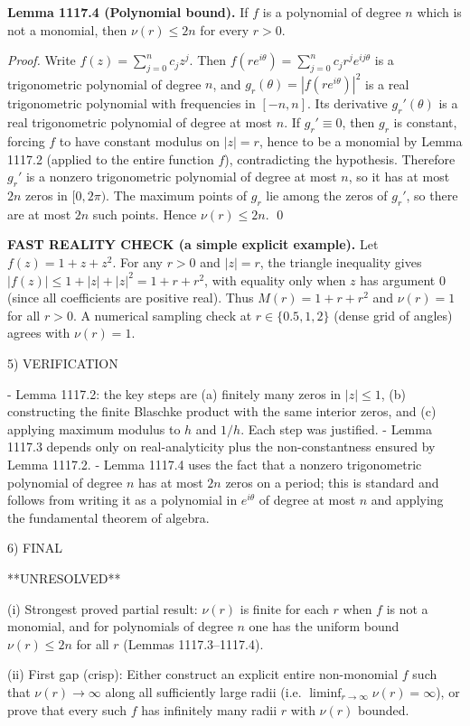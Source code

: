 \textbf{Lemma 1117.4 (Polynomial bound).}
If \(f\) is a polynomial of degree \(n\) which is not a monomial, then \(\nu(r)\le 2n\) for every \(r>0\).

\emph{Proof.}
Write \(f(z)=\sum_{j=0}^n c_j z^j\). Then
\(f(r e^{i\theta})=\sum_{j=0}^n c_j r^j e^{ij\theta}\) is a trigonometric polynomial of degree \(n\), and
\(g_r(\theta)=|f(r e^{i\theta})|^2\) is a real trigonometric polynomial with frequencies in \([-n,n]\). Its derivative \(g_r'(\theta)\) is a real trigonometric polynomial of degree at most \(n\). If \(g_r'\equiv 0\), then \(g_r\) is constant, forcing \(f\) to have constant modulus on \(|z|=r\), hence to be a monomial by Lemma 1117.2 (applied to the entire function \(f\)), contradicting the hypothesis. Therefore \(g_r'\) is a nonzero trigonometric polynomial of degree at most \(n\), so it has at most \(2n\) zeros in \([0,2\pi)\).
The maximum points of \(g_r\) lie among the zeros of \(g_r'\), so there are at most \(2n\) such points. Hence \(\nu(r)\le 2n\). \qed

\textbf{FAST REALITY CHECK (a simple explicit example).}
Let \(f(z)=1+z+z^2\). For any \(r>0\) and \(|z|=r\), the triangle inequality gives
\(|f(z)|\le 1+|z|+|z|^2 = 1+r+r^2\), with equality only when \(z\) has argument \(0\) (since all coefficients are positive real). Thus \(M(r)=1+r+r^2\) and \(\nu(r)=1\) for all \(r>0\).
A numerical sampling check at \(r\in\{0.5,1,2\}\) (dense grid of angles) agrees with \(\nu(r)=1\).

5) VERIFICATION

- Lemma 1117.2: the key steps are (a) finitely many zeros in \(|z|\le 1\), (b) constructing the finite Blaschke product with the same interior zeros, and (c) applying maximum modulus to \(h\) and \(1/h\). Each step was justified.
- Lemma 1117.3 depends only on real-analyticity plus the non-constantness ensured by Lemma 1117.2.
- Lemma 1117.4 uses the fact that a nonzero trigonometric polynomial of degree \(n\) has at most \(2n\) zeros on a period; this is standard and follows from writing it as a polynomial in \(e^{i\theta}\) of degree at most \(n\) and applying the fundamental theorem of algebra.

6) FINAL

**UNRESOLVED**

(i) Strongest proved partial result: \(\nu(r)\) is finite for each \(r\) when \(f\) is not a monomial, and for polynomials of degree \(n\) one has the uniform bound \(\nu(r)\le 2n\) for all \(r\) (Lemmas 1117.3--1117.4).

(ii) First gap (crisp): Either construct an explicit entire non-monomial \(f\) such that \(\nu(r)\to\infty\) along all sufficiently large radii (i.e. \(\liminf_{r\to\infty}\nu(r)=\infty\)), or prove that every such \(f\) has infinitely many radii \(r\) with \(\nu(r)\) bounded.

